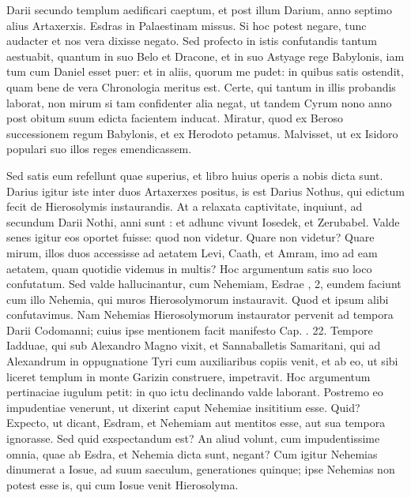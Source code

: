 Darii secundo templum aedificari caeptum, et post illum Darium,
anno septimo alius Artaxerxis.
Esdras in Palaestinam missus.
Si hoc potest negare, tunc audacter et nos vera dixisse negato.
Sed profecto
in istis confutandis tantum aestuabit, quantum in suo Belo et
Dracone, et in suo Astyage rege Babylonis, iam tum cum Daniel
esset puer: et in aliis, quorum me pudet: in quibus satis ostendit,
quam bene de vera Chronologia meritus est.
Certe, qui tantum in
illis probandis laborat, non mirum si tam confidenter alia negat, ut
tandem Cyrum nono anno post obitum suum edicta facientem inducat.
Miratur, quod ex Beroso successionem regum Babylonis, et
ex Herodoto petamus. Malvisset, ut ex Isidoro populari suo illos
reges emendicassem.

Sed satis eum refellunt quae superius, et libro
 huius operis a nobis dicta sunt.
Darius igitur iste inter duos Artaxerxes
positus, is est Darius Nothus, qui edictum fecit de Hierosolymis
instaurandis.
At a relaxata captivitate, inquiunt, ad secundum
Darii Nothi, anni sunt : et adhunc vivunt Iosedek, et Zerubabel.
Valde senes igitur eos oportet fuisse: quod non videtur.
Quare non videtur?
Quare mirum, illos duos accessisse ad aetatem
Levi, Caath, et Amram, imo ad eam aetatem, quam quotidie videmus
in multis?
Hoc argumentum satis suo loco confutatum.
Sed
valde hallucinantur, cum Nehemiam, Esdrae , 2, eundem faciunt
cum illo Nehemia, qui muros Hierosolymorum instauravit.
Quod et ipsum alibi confutavimus.
Nam Nehemias Hierosolymorum
instaurator pervenit ad tempora Darii Codomanni;
cuius ipse mentionem facit manifesto Cap. . 22.
Tempore Iadduae,
qui sub Alexandro Magno vixit, et Sannaballetis Samaritani,
qui ad Alexandrum in oppugnatione Tyri cum auxiliaribus
copiis venit, et ab eo, ut sibi liceret templum in monte Garizin
construere, impetravit.
Hoc argumentum pertinaciae iugulum
petit: in quo ictu declinando valde laborant.
Postremo
eo impudentiae venerunt, ut dixerint caput  Nehemiae insititium
esse.
Quid?
Expecto, ut dicant, Esdram, et Nehemiam aut
mentitos esse, aut sua tempora ignorasse.
Sed quid exspectandum
est?
An aliud volunt, cum impudentissime omnia, quae ab Esdra,
et Nehemia dicta sunt, negant?
Cum igitur Nehemias dinumerat
a Iosue, ad suum saeculum, generationes quinque; ipse
Nehemias non potest esse is, qui cum Iosue venit Hierosolyma.
